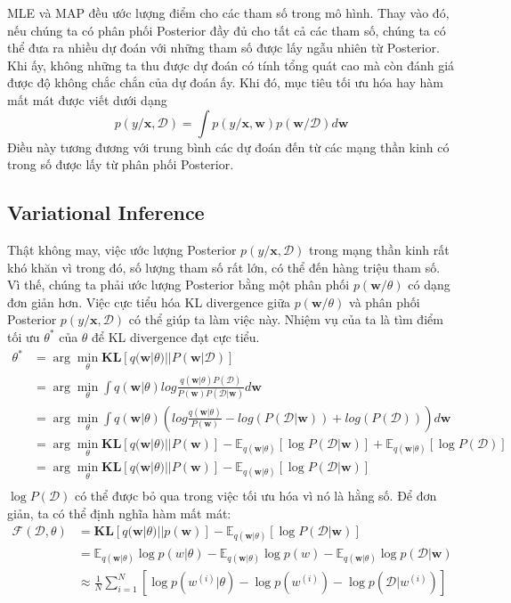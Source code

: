 MLE và MAP đều ước lượng điểm cho các tham số trong mô hình. Thay vào đó, nếu chúng ta có phân phối Posterior đầy đủ cho tất cả các tham số, chúng ta có thể đưa ra nhiều dự đoán với những tham số được lấy ngẫu nhiên từ Posterior. Khi ấy, không những ta thu được dự đoán có tính tổng quát cao mà còn đánh giá được độ không chắc chắn của dự đoán ấy. Khi đó, mục tiêu tối ưu hóa hay hàm mất mát được viết dưới dạng
\begin{equation*}
p(y/\textbf{x},\mathcal{D}) = \int p(y/\textbf{x},\textbf{w})p(\textbf{w}/\mathcal{D})d\textbf{w}
\end{equation*}
Điều này tương đương với trung bình các dự đoán đến từ các mạng thần kinh có trong số được lấy từ phân phối Posterior.
\subsection{Variational Inference}
Thật không may, việc ước lượng Posterior $p(y/\textbf{x},\mathcal{D})$ trong mạng thần kinh rất khó khăn vì trong đó, số lượng tham số rất lớn, có thể đến hàng triệu tham số. Vì thế, chúng ta phải ước lượng Posterior bằng một phân phối $p(\textbf{w}/\theta)$ có dạng đơn giản hơn. Việc cực tiểu hóa KL divergence giữa $p(\textbf{w}/\theta)$ và phân phối Posterior $p(y/\textbf{x},\mathcal{D})$ có thể giúp ta làm việc này. Nhiệm vụ của ta là tìm điểm tối ưu $\theta^*$ của $\theta$ để KL divergence đạt cực tiểu.
\begin{align*}
\theta^* &= \arg\min_{\theta}\textbf{KL}[q(\textbf{w}|\theta)||P(\textbf{w}|\mathcal{D})] \\
& = \arg\min_{\theta}\displaystyle \int q(\textbf{w}|\theta)log\frac{q(\textbf{w}|\theta)P(\mathcal{D})}{P(\textbf{w})P(\mathcal{D}|\textbf{w})}d\textbf{w} \\
& = \arg\min_{\theta}\displaystyle \int q(\textbf{w}|\theta)(log\frac{q(\textbf{w}|\theta)}{P(\textbf{w})}-log(P(\mathcal{D}|\textbf{w}))+ log(P(\mathcal{D})))d\textbf{w} \\
& = \arg\min_{\theta}\textbf{KL}[q(\textbf{w}|\theta)||P(\textbf{w})] - \mathbb{E}_{q(\textbf{w}|\theta)}[\log P(\mathcal{D}|\textbf{w})] + \mathbb{E}_{q(\textbf{w}|\theta)}[\log P(\mathcal{D})] \\
& = \arg\min_{\theta}\textbf{KL}[q(\textbf{w}|\theta)||P(\textbf{w})] - \mathbb{E}_{q(\textbf{w}|\theta)}[\log P(\mathcal{D}|\textbf{w})] \\
\end{align*}
$\log P(\mathcal{D})$ có thể được bỏ qua trong việc tối ưu hóa vì nó là hằng số.
Để đơn giản, ta có thể định nghĩa hàm mất mát:
\begin{align*}
\mathcal{F}(\mathcal{D},\theta) &= \textbf{KL}[q(\textbf{w}|\theta)||p(\textbf{w})] - \mathbb{E}_{q(\textbf{w}|\theta)}[\log P(\mathcal{D}|\textbf{w})]  \\
& = \mathbb{E}_{q(\textbf{w}|\theta)}\log p(w|\theta) - \mathbb{E}_{q(\textbf{w}|\theta)}\log p(w) - \mathbb{E}_{q(\textbf{w}|\theta)}\log p(\mathcal{D}|\textbf{w}) \\
& \approx\frac{1}{N}\sum_{i = 1}^{N}[\log p(w^{(i)}|\theta) - \log p(w^{(i)}) - \log p(\mathcal{D}|w^{(i)})]\\
\end{align*}
